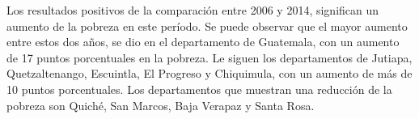 Los resultados positivos de la comparación entre 2006 y 2014, significan un aumento de la pobreza en este período. Se puede observar que el mayor aumento entre estos dos años, se dio en el departamento de Guatemala, con un aumento de 17 puntos porcentuales en la pobreza. Le siguen los departamentos de Jutiapa, Quetzaltenango, Escuintla, El Progreso y Chiquimula, con un aumento de más de 10 puntos porcentuales. Los departamentos que muestran una reducción de la pobreza son Quiché, San Marcos, Baja Verapaz y Santa Rosa. 